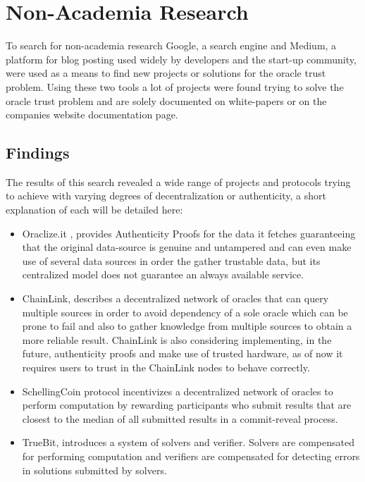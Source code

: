 \section{Non-Academia Research}

To search for non-academia research Google, a search engine and Medium, a platform for blog posting used widely by developers and the start-up community, were used as a means to find new projects or solutions for the oracle trust problem. Using these two tools a lot of projects were found trying to solve the oracle trust problem and are solely documented on white-papers or on the companies website documentation page.

\subsection{Findings}
The results of this search revealed a wide range of projects and protocols trying to achieve with varying degrees of decentralization or authenticity, a short explanation of each will be detailed here: 

\begin{itemize}
\item Oraclize.it \cite{Oraclize.it2018OraclizeDocumentation}, provides Authenticity Proofs for the data it fetches guaranteeing that the original data-source is genuine and untampered and can even make use of several data sources in order the gather trustable data, but its centralized model does not guarantee an always available service.
\item ChainLink\cite{Ellis2017ChainLinkNetwork}, describes a decentralized network of oracles that can query multiple sources in order to avoid dependency of a sole oracle which can be prone to fail and also to gather knowledge from multiple sources to obtain a more reliable result. ChainLink is also considering implementing, in the future, authenticity proofs and make use of trusted hardware, as of now it requires users to trust in the ChainLink nodes to behave correctly.
\item SchellingCoin protocol incentivizes a decentralized network of oracles
to perform computation by rewarding participants who submit results
that are closest to the median of all submitted results in a commit-reveal
process.
\item TrueBit, introduces a system of solvers and verifier. Solvers are
compensated for performing computation and verifiers are compensated
for detecting errors in solutions submitted by solvers.
\end{itemize}


